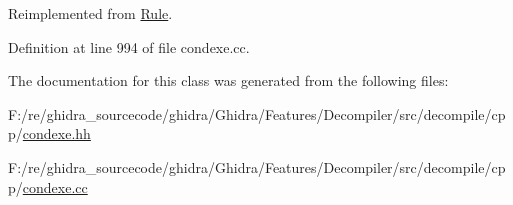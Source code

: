 Reimplemented from \mbox{\hyperlink{class_rule_a4023bfc7825de0ab866790551856d10e}{Rule}}.



Definition at line 994 of file condexe.\+cc.



The documentation for this class was generated from the following files\+:\begin{DoxyCompactItemize}
\item 
F\+:/re/ghidra\+\_\+sourcecode/ghidra/\+Ghidra/\+Features/\+Decompiler/src/decompile/cpp/\mbox{\hyperlink{condexe_8hh}{condexe.\+hh}}\item 
F\+:/re/ghidra\+\_\+sourcecode/ghidra/\+Ghidra/\+Features/\+Decompiler/src/decompile/cpp/\mbox{\hyperlink{condexe_8cc}{condexe.\+cc}}\end{DoxyCompactItemize}
